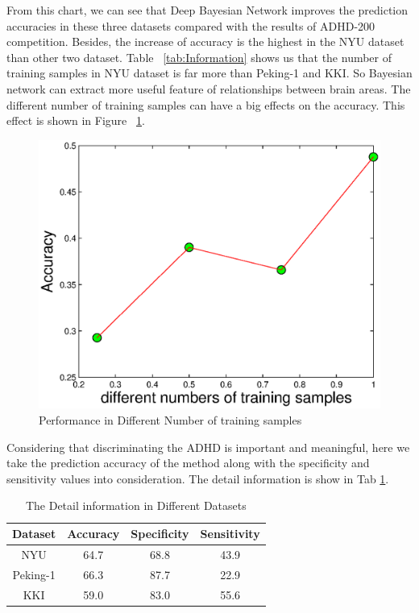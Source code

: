 \documentclass[10pt,twocolumn,letterpaper]{article}
\begin{document}
From this chart, we can see that Deep Bayesian Network improves the prediction accuracies  in these three datasets  compared with the results of ADHD-200 competition. Besides, the increase of accuracy is the highest in the NYU dataset than other two dataset. Table ~\ref{tab:Information} shows us that the number of training samples in NYU dataset is far more than Peking-1 and KKI. So Bayesian network can extract more useful feature of relationships between brain areas. The different number of training samples can have a big effects on the accuracy. This effect is shown in Figure ~\ref{fig:Number}.
\begin{figure}[ht]
\begin{center}
   \includegraphics[width=0.7\linewidth]{Number.eps}
\end{center}
   \caption{Performance in Different Number of training samples}
\label{fig:Number}
\end{figure}



Considering that discriminating the ADHD is important and meaningful, here we take the prediction accuracy of the method along with the specificity and sensitivity values into consideration. The detail information is show in Tab \ref{tab:2}.



\begin{table}[h]
\label{tab:2}
\begin{center}
\begin{tabular}{cccc}
\hline

Dataset  	&   Accuracy  	&	Specificity  &	Sensitivity \\
\hline
NYU			&  64.7	&  68.8 & 43.9 \\[2pt]
Peking-1		& 66.3 & 87.7 &22.9\\[2pt]
KKI			& 59.0  & 83.0  & 55.6\\[2pt]
\hline
\end{tabular}
\end{center}
\caption{The Detail information in Different Datasets}
\end{table}
\end{document}
